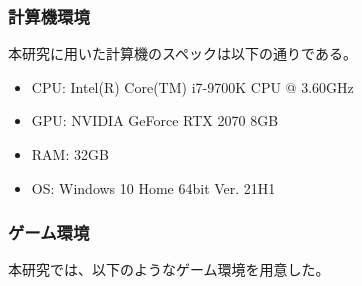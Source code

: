 \documentclass[dvipdfmx]{jsarticle}
\begin{document}
        \subsubsection{計算機環境}
        本研究に用いた計算機のスペックは以下の通りである。
        \begin{itemize}
            \item CPU: Intel(R) Core(TM) i7-9700K CPU @ 3.60GHz
            \item GPU: NVIDIA GeForce RTX 2070 8GB
            \item RAM: 32GB
            \item OS: Windows 10 Home 64bit Ver. 21H1
        \end{itemize}
        \subsubsection{ゲーム環境}
        本研究では、以下のようなゲーム環境を用意した。
\end{document}
